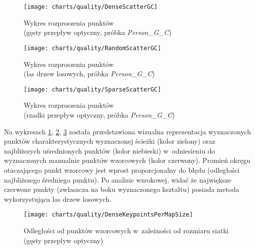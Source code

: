     \newpage
      \begin{figure}[!ht]
        \centering
        \texttt{[image: charts/quality/DenseScatterGC]}
        \caption[Wykres rozproszenia punktów (gęsty przepływ optyczny)]
                {Wykres rozproszenia punktów\\(gęsty przepływ optyczny, próbka \textit{Person\_G\_C})}
        \label{fig:DenseScatterGC}
      \end{figure}

      \begin{figure}[!ht]
        \centering
        \texttt{[image: charts/quality/RandomScatterGC]}
        \caption[Wykres rozproszenia punktów (las drzew losowych)]
                {Wykres rozproszenia punktów\\(las drzew losowych, próbka \textit{Person\_G\_C})}
        \label{fig:RandomScatterGC}
      \end{figure}

      \begin{figure}[!ht]
        \centering
        \texttt{[image: charts/quality/SparseScatterGC]}
        \caption[Wykres rozproszenia punktów (rzadki przepływ optyczny)]
                {Wykres rozproszenia punktów\\(rzadki przepływ optyczny, próbka \textit{Person\_G\_C})}
        \label{fig:SparseScatterGC}
      \end{figure}

    Na wykresach \ref{fig:DenseScatterGC}, \ref{fig:RandomScatterGC}, \ref{fig:SparseScatterGC} została przedstawiona wizualna reprezentacja wyznaczonych punktów charakterystycznych wyznaczonej ścieżki (kolor zielony) oraz najbliższych uśrednionych punktów (kolor niebieski) w~odniesieniu do wyznaczonych manualnie punktów wzorcowych (kolor czerwony). Promień okręgu otaczającego punkt wzorcowy jest wprost proporcjonalny do błędu (odległości najbliższego średniego punktu). Po analizie wzrokowej, widać że największe czerwone punkty (zwłaszcza na boku wyznaczonego kształtu) posiada metoda wykorzystująca las drzew losowych.

      \begin{figure}[!ht]
        \centering
        \texttt{[image: charts/quality/DenseKeypointsPerMapSize]}
        \caption[Odległości od punktów wzorcowych w~zależności od rozmiaru siatki]
                {Odległości od punktów wzorcowych w~zależności od rozmiaru siatki (gęsty przepływ optyczny)}
        \label{fig:DenseKeypointsPerMapSize}
      \end{figure}

